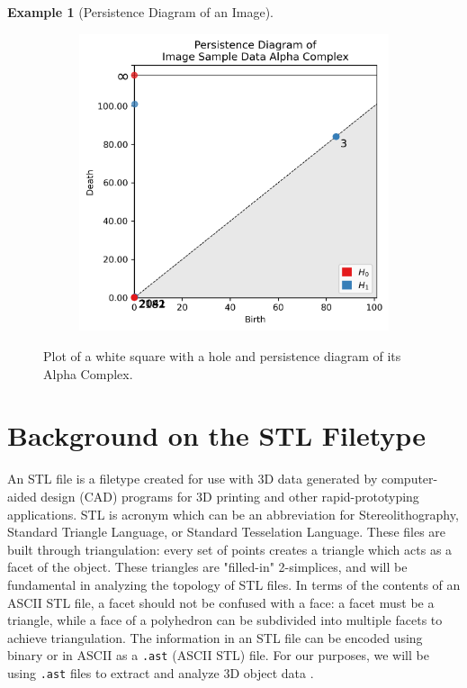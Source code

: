\documentclass[ma]{uncgdissertationexp}
\theoremstyle{plain}
\theoremstyle{definition}
\newtheorem{example}[theorem]{Example}
\theoremstyle{remark}
\begin{document}
\begin{example}[Persistence Diagram of an Image]
\begin{figure}[H]
\begin{subfigure}[b]{0.45\textwidth}
    \end{subfigure}
    \begin{subfigure}[b]{0.5\textwidth}
        \centering
        \includegraphics[width=\textwidth]{image_data_persdia.png}
    \end{subfigure}
    \caption{Plot of a white square with a hole and persistence diagram of its Alpha Complex.}
    \label{fig:image_data_persdia}
\end{figure}
\end{example}
\newpage
\section{Background on the STL Filetype}
\par An STL file is a filetype created for use with 3D data generated by computer-aided design (CAD) programs for 3D printing and other rapid-prototyping applications. STL is acronym which can be an abbreviation for Stereolithography, Standard Triangle Language, or Standard Tesselation Language. These files are built through triangulation: every set of points creates a triangle which acts as a facet of the object. These triangles are "filled-in" 2-simplices, and will be fundamental in analyzing the topology of STL files. In terms of the contents of an ASCII STL file, a facet should not be confused with a face: a facet must be a triangle, while a face of a polyhedron can be subdivided into multiple facets to achieve triangulation. The information in an STL file can be encoded using binary or in ASCII as a \verb".ast" (ASCII STL) file. For our purposes, we will be using \verb".ast" files to extract and analyze 3D object data \cite{analysis_of_stl}.
\end{document}
